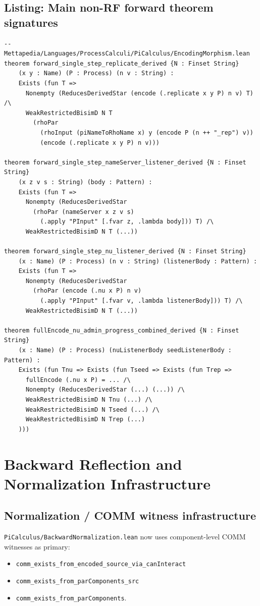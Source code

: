 \documentclass[11pt]{article}
\begin{document}
\subsection*{Listing: Main non-RF forward theorem signatures}
\begin{lstlisting}
-- Mettapedia/Languages/ProcessCalculi/PiCalculus/EncodingMorphism.lean
theorem forward_single_step_replicate_derived {N : Finset String}
    (x y : Name) (P : Process) (n v : String) :
    Exists (fun T =>
      Nonempty (ReducesDerivedStar (encode (.replicate x y P) n v) T) /\
      WeakRestrictedBisimD N T
        (rhoPar
          (rhoInput (piNameToRhoName x) y (encode P (n ++ "_rep") v))
          (encode (.replicate x y P) n v)))

theorem forward_single_step_nameServer_listener_derived {N : Finset String}
    (x z v s : String) (body : Pattern) :
    Exists (fun T =>
      Nonempty (ReducesDerivedStar
        (rhoPar (nameServer x z v s)
          (.apply "PInput" [.fvar z, .lambda body])) T) /\
      WeakRestrictedBisimD N T (...))

theorem forward_single_step_nu_listener_derived {N : Finset String}
    (x : Name) (P : Process) (n v : String) (listenerBody : Pattern) :
    Exists (fun T =>
      Nonempty (ReducesDerivedStar
        (rhoPar (encode (.nu x P) n v)
          (.apply "PInput" [.fvar v, .lambda listenerBody])) T) /\
      WeakRestrictedBisimD N T (...))

theorem fullEncode_nu_admin_progress_combined_derived {N : Finset String}
    (x : Name) (P : Process) (nuListenerBody seedListenerBody : Pattern) :
    Exists (fun Tnu => Exists (fun Tseed => Exists (fun Trep =>
      fullEncode (.nu x P) = ... /\
      Nonempty (ReducesDerivedStar (...) (...)) /\
      WeakRestrictedBisimD N Tnu (...) /\
      WeakRestrictedBisimD N Tseed (...) /\
      WeakRestrictedBisimD N Trep (...)
    )))
\end{lstlisting}

\section{Backward Reflection and Normalization Infrastructure}
\subsection*{Normalization / COMM witness infrastructure}
\texttt{PiCalculus/BackwardNormalization.lean} now uses component-level COMM witnesses as primary:
\begin{itemize}
  \item \texttt{comm\_exists\_from\_encoded\_source\_via\_canInteract}
  \item \texttt{comm\_exists\_from\_parComponents\_src}
  \item \texttt{comm\_exists\_from\_parComponents}.
\end{itemize}
\end{document}
